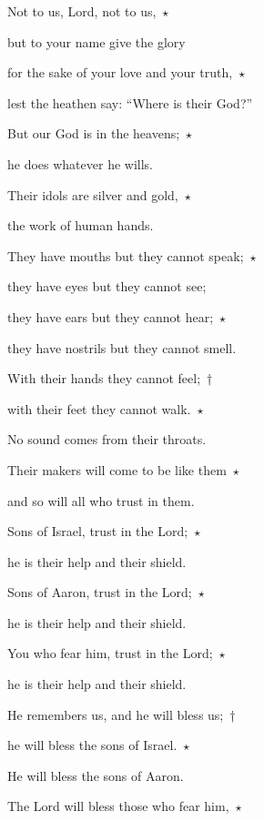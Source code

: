 \noindent Not to us, Lord, not to us,~$\star$~

but to your name give the glory

\noindent for the sake of your love and your truth,~$\star$~

lest the heathen say: “Where is their God?”



\noindent But our God is in the heavens;~$\star$~

he does whatever he wills.

\noindent Their idols are silver and gold,~$\star$~

the work of human hands.



\noindent They have mouths but they cannot speak;~$\star$~

they have eyes but they cannot see;

\noindent they have ears but they cannot hear;~$\star$~

they have nostrils but they cannot smell.



\noindent With their hands they cannot feel;~†~

with their feet they cannot walk.~$\star$~

No sound comes from their throats.



\noindent Their makers will come to be like them~$\star$~

and so will all who trust in them.



\noindent Sons of Israel, trust in the Lord;~$\star$~

he is their help and their shield.

\noindent Sons of Aaron, trust in the Lord;~$\star$~

he is their help and their shield.



\noindent You who fear him, trust in the Lord;~$\star$~

he is their help and their shield.

\noindent He remembers us, and he will bless us;~†~

he will bless the sons of Israel.~$\star$~

He will bless the sons of Aaron.



\noindent The Lord will bless those who fear him,~$\star$~

